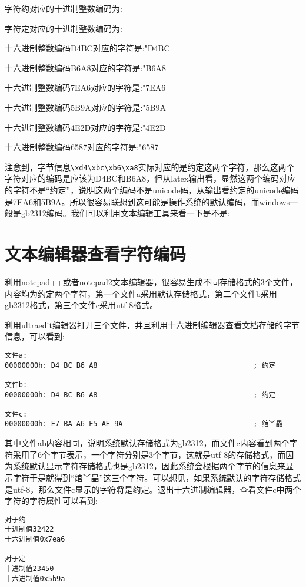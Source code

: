 \documentclass[twoside,11pt]{book}
\begin{document}
字符约对应的十进制整数编码为:
\setcounter{charcode}{`约}
\thecharcode

字符定对应的十进制整数编码为:
\setcounter{charcode}{`定}
\thecharcode

十六进制整数编码D4BC对应的字符是:\char"D4BC

十六进制整数编码B6A8对应的字符是:\char"B6A8

十六进制整数编码7EA6对应的字符是:\char"7EA6

十六进制整数编码5B9A对应的字符是:\char"5B9A

十六进制整数编码4E2D对应的字符是:\char"4E2D

十六进制整数编码6587对应的字符是:\char"6587

注意到，字节信息\lstinline!\xd4\xbc\xb6\xa8!实际对应的是约定这两个字符，那么这两个字符对应的编码是应该为D4BC和B6A8，但从latex输出看，显然这两个编码对应的字符不是“约定”，说明这两个编码不是unicode码，从输出看约定的unicode编码是7EA6和5B9A。所以很容易联想到这可能是操作系统的默认编码，而windows一般是gb2312编码。我们可以利用文本编辑工具来看一下是不是:

\section{文本编辑器查看字符编码}
利用notepad++或者notepad2文本编辑器，很容易生成不同存储格式的3个文件，内容均为约定两个字符，第一个文件a采用默认存储格式，第二个文件b采用gb2312格式，第三个文件c采用utf-8格式。

利用ultraedit编辑器打开三个文件，并且利用十六进制编辑器查看文档存储的字节信息，可以看到:
\begin{lstlisting}
文件a:
00000000h: D4 BC B6 A8                                     ; 约定

文件b:
00000000h: D4 BC B6 A8                                     ; 约定

文件c:
00000000h: E7 BA A6 E5 AE 9A                               ; 绾﹀畾
\end{lstlisting}

其中文件ab内容相同，说明系统默认存储格式为gb2312，而文件c内容看到两个字符采用了6个字节表示，一个字符分别是3个字节，这就是utf-8的存储格式，而因为系统默认显示字符存储格式也是gb2312，因此系统会根据两个字节的信息来显示字符于是就得到“绾﹀畾”这三个字符。可以想见，如果系统默认的字符存储格式是utf-8，那么文件c显示的字符将是约定。退出十六进制编辑器，查看文件c中两个字符的字符属性可以看到:
\begin{lstlisting}
对于约
十进制值32422
十六进制值0x7ea6

对于定
十进制值23450
十六进制值0x5b9a
\end{lstlisting}
\end{document}
